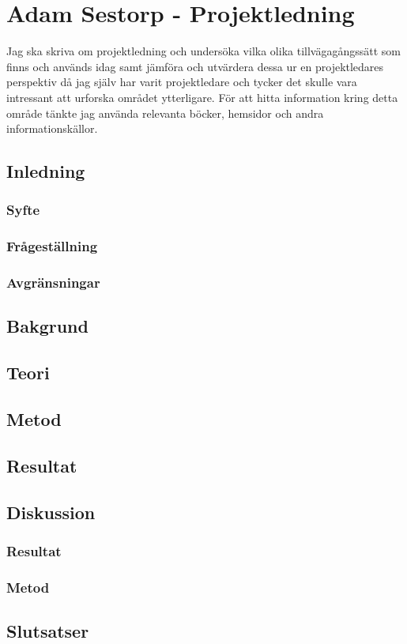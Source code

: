 \section{Adam Sestorp - Projektledning}
Jag ska skriva om projektledning och undersöka vilka olika tillvägagångssätt som finns och används idag samt jämföra och utvärdera dessa ur en projektledares perspektiv då jag själv har varit projektledare och tycker det skulle vara intressant att urforska området ytterligare. 
\newline
För att hitta information kring detta område tänkte jag använda relevanta böcker, hemsidor och andra informationskällor.
\subsection{Inledning}
\subsubsection{Syfte}
\subsubsection{Frågeställning}
\subsubsection{Avgränsningar}
\subsection{Bakgrund}
\subsection{Teori}
\subsection{Metod}
\subsection{Resultat}
\subsection{Diskussion}
\subsubsection{Resultat}
\subsubsection{Metod}
\subsection{Slutsatser}
